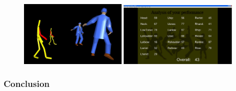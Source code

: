 \begin{figure}
	\centering
	\includegraphics[width=0.45\textwidth]{img/VRDanceTrainerPractice.png}
	\includegraphics[width=0.5\textwidth]{img/VRDanceTrainerScoreBoard.png}
	\caption{\todo \cite{Chan2011}}
	\label{fig:vrdt}
\end{figure}



\subsubsection{Conclusion}

